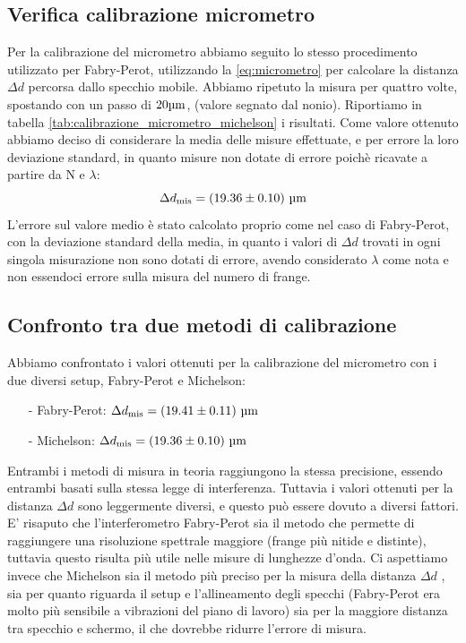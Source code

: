 \documentclass[letterpaper,12pt]{article}
\begin{document}
\subsection{Verifica calibrazione micrometro}
Per la calibrazione del micrometro abbiamo seguito lo stesso procedimento utilizzato per Fabry-Perot, 
utilizzando la  \eqref{eq:micrometro} per calcolare la distanza $\Delta d$ percorsa dallo specchio mobile. Abbiamo ripetuto
la misura per quattro volte, spostando con un passo di $20 \text{\SIUnitSymbolMicro m}$, (valore segnato 
dal nonio). Riportiamo in tabella \ref{tab:calibrazione_micrometro_michelson} i risultati. Come valore ottenuto
abbiamo deciso di considerare la media delle misure effettuate, e per errore la loro deviazione standard, in quanto 
misure non dotate di errore poichè ricavate a partire da N e $\lambda$:
$$\Delta d_\text{mis} = (19.36 \pm0.10)\ \text{\SIUnitSymbolMicro m} $$
L'errore sul valore medio è stato calcolato proprio come nel caso di Fabry-Perot, con la deviazione standard della media,
in quanto i valori di $\Delta d$ trovati in ogni singola misurazione non sono dotati di errore, avendo considerato 
$\lambda$ come nota e non essendoci errore sulla misura del numero di frange.\\


\subsection{Confronto tra due metodi di calibrazione}

Abbiamo confrontato i valori ottenuti per la calibrazione del micrometro con i due diversi setup, Fabry-Perot e Michelson:
\begin{itemize}
    \item[-] Fabry-Perot: $\Delta d_\text{mis} = (19.41 \pm0.11)\ \text{\SIUnitSymbolMicro m} $
    \item[-] Michelson: $\Delta d_\text{mis} = (19.36 \pm0.10)\ \text{\SIUnitSymbolMicro m} $
\end{itemize}

Entrambi i metodi di misura in teoria raggiungono la stessa precisione, essendo entrambi basati sulla stessa legge di interferenza.
Tuttavia i valori ottenuti per la distanza $\Delta d$ sono leggermente diversi, e questo può essere dovuto a diversi fattori.
E' risaputo che l'interferometro Fabry-Perot sia il metodo che permette di raggiungere una risoluzione spettrale maggiore (frange più nitide e distinte), tuttavia questo risulta più utile nelle misure di lunghezze d'onda.
Ci aspettiamo invece che Michelson sia il metodo più preciso per la misura della distanza $\Delta d$ , sia per quanto riguarda il setup e l'allineamento degli specchi (Fabry-Perot era molto più sensibile a vibrazioni del piano di lavoro)
sia per la maggiore distanza tra specchio e schermo, il che dovrebbe ridurre l'errore di misura.\\
\end{document}
